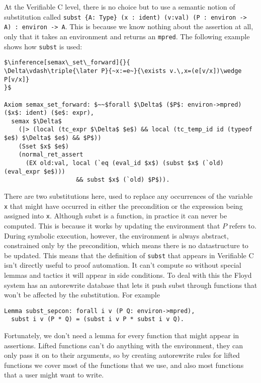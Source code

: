 \documentclass{puthesis}
\begin{document}
At the Verifiable C level, there is no choice but to use a semantic
notion of substitution called 
\lstinline|subst {A: Type} (x : ident) (v:val) (P : environ -> A) : environ -> A|.
This is because we know nothing about the assertion at all, only that
it takes an environment and returns an \lstinline|mpred|. The following example
shows how \lstinline|subst| is used:

\begin{lstlisting}
$\inference[semax\_set\_forward]{}{
\Delta\vdash\triple{\later P}{~x:=e~}{\exists v.\,x=(e[v/x])\wedge P[v/x]}
}$

Axiom semax_set_forward: $~~$forall $\Delta$ ($P$: environ->mpred) ($x$: ident) ($e$: expr),
  semax $\Delta$
    (|> (local (tc_expr $\Delta$ $e$) && local (tc_temp_id id (typeof $e$) $\Delta$ $e$) && $P$))
    (Sset $x$ $e$) 
    (normal_ret_assert 
      (EX old:val, local (`eq (eval_id $x$) (subst $x$ (`old) (eval_expr $e$)))
                    && subst $x$ (`old) $P$)).
\end{lstlisting}

There are two substitutions here, used to replace any occurrences of the
variable \lstinline|x| that might have occurred in either the precondition
or the expression being assigned into \lstinline|x|. 
Although subst is a function, in practice it can never be computed.
This is because it works by updating the environment that $P$
refers to. During symbolic execution, however, the environment is always
abstract, constrained only by the precondition, which means there is
no datastructure to be updated. This means that the definition of 
\lstinline|subst| that appears in Verifiable C isn't directly 
useful to proof automation. It can't compute so without special
lemmas and tactics it will appear in side conditions. To deal with
this the Floyd system has an autorewrite database that lets it push
subst through functions that won't be affected by the substitution. For
example 

\begin{lstlisting}
Lemma subst_sepcon: forall i v (P Q: environ->mpred),
  subst i v (P * Q) = (subst i v P * subst i v Q).
\end{lstlisting}

Fortunately, we don't need a lemma for every function that might
appear in assertions. Lifted functions can't do anything with the
environment, they can only pass it on to their arguments, so
by creating autorewrite rules for lifted functions we cover
most of the functions that we use, and also most functions
that a user might want to write. 
\end{document}
